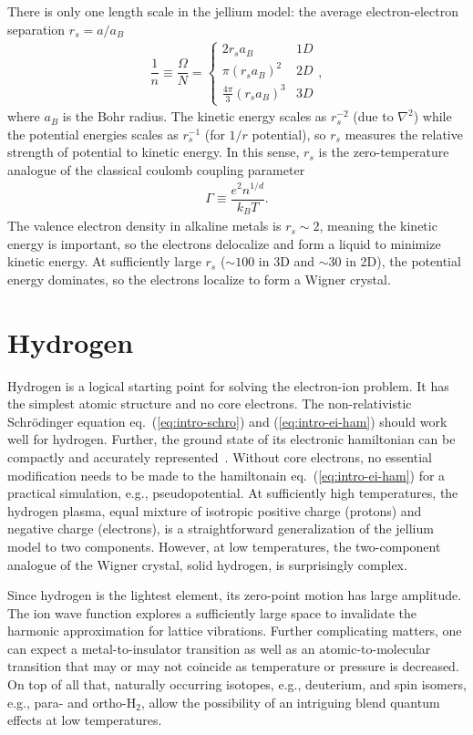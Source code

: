 There is only one length scale in the jellium model: the average electron-electron separation $r_s=a/a_B$
\begin{align}
\dfrac{1}{n} \equiv \dfrac{\Omega}{N} = \left\{\begin{array}{lr}
2 r_s a_B & 1D\\
\pi(r_sa_B)^2 & 2D\\
\frac{4\pi}{3}(r_sa_B)^3 & 3D
\end{array}\right.,
\end{align}
where $a_B$ is the Bohr radius. The kinetic energy scales as $r_s^{-2}$ (due to $\nabla^2$) while the potential energies scales as $r_s^{-1}$ (for $1/r$ potential), so $r_s$ measures the relative strength of potential to kinetic energy. In this sense, $r_s$ is the zero-temperature analogue of the classical coulomb coupling parameter
\begin{align}
\Gamma \equiv \dfrac{e^2n^{1/d}}{k_BT}.
\end{align}
The valence electron density in alkaline metals is $r_s\sim2$, meaning the kinetic energy is important, so the electrons delocalize and form a liquid to minimize kinetic energy. At sufficiently large $r_s$ ($\sim 100$ in 3D and $\sim 30$ in 2D), the potential energy dominates, so the electrons localize to form a Wigner crystal.

\section{Hydrogen}
Hydrogen is a logical starting point for solving the electron-ion problem.
It has the simplest atomic structure and no core electrons.
The non-relativistic Schr\"odinger equation eq.~(\ref{eq:intro-schro}) and (\ref{eq:intro-ei-ham}) should work well for hydrogen. Further, the ground state of its electronic hamiltonian can be compactly and accurately represented~\cite{Holzmann2003}.
Without core electrons, no essential modification needs to be made to the hamiltonain eq.~(\ref{eq:intro-ei-ham}) for a practical simulation, e.g., pseudopotential.
At sufficiently high temperatures, the hydrogen plasma, equal mixture of isotropic positive charge (protons) and negative charge (electrons), is a straightforward generalization of the jellium model to two components. However, at low temperatures, the two-component analogue of the Wigner crystal, solid hydrogen, is surprisingly complex.

Since hydrogen is the lightest element, its zero-point motion has large amplitude. The ion wave function explores a sufficiently large space to invalidate the harmonic approximation for lattice vibrations.
Further complicating matters, one can expect a metal-to-insulator transition as well as an atomic-to-molecular transition that may or may not coincide as temperature or pressure is decreased.
On top of all that, naturally occurring isotopes, e.g., deuterium, and spin isomers, e.g., para- and ortho-H$_2$, allow the possibility of an intriguing blend quantum effects at low temperatures.

